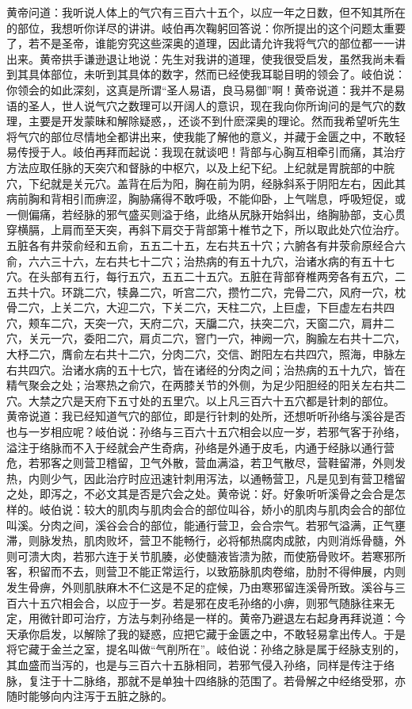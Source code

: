 \documentclass[12pt,UTF8]{ctexbook}
\begin{document}
黄帝问道：我听说人体上的气穴有三百六十五个，以应一年之日数，但不知其所在的部位，我想听你详尽的讲讲。岐伯再次鞠躬回答说：你所提出的这个问题太重要了，若不是圣帝，谁能穷究这些深奥的道理，因此请允许我将气穴的部位都一一讲出来。黄帝拱手谦逊退让地说：先生对我讲的道理，使我很受启发，虽然我尚未看到其具体部位，未听到其具体的数字，然而已经使我耳聪目明的领会了。岐伯说：你领会的如此深刻，这真是所谓“圣人易语，良马易御”啊！黄帝说道：我并不是易语的圣人，世人说气穴之数理可以开阔人的意识，现在我向你所询问的是气穴的数理，主要是开发蒙昧和解除疑惑，，还谈不到什麽深奥的理论。然而我希望听先生将气穴的部位尽情地全都讲出来，使我能了解他的意义，并藏于金匮之中，不敢轻易传授于人。岐伯再拜而起说：我现在就谈吧！背部与心胸互相牵引而痛，其治疗方法应取任脉的天突穴和督脉的中枢穴，以及上纪下纪。上纪就是胃脘部的中脘穴，下纪就是关元穴。盖背在后为阳，胸在前为阴，经脉斜系于阴阳左右，因此其病前胸和背相引而痹涩，胸胁痛得不敢呼吸，不能仰卧，上气喘息，呼吸短促，或一侧偏痛，若经脉的邪气盛买则溢于络，此络从尻脉开始斜出，络胸胁部，支心贯穿横膈，上肩而至天突，再斜下肩交于背部第十椎节之下，所以取此处穴位治疗。
五脏各有井荥俞经和五俞，五五二十五，左右共五十穴；六腑各有井荥俞原经合六俞，六六三十六，左右共七十二穴；治热病的有五十九穴，治诸水病的有五十七穴。在头部有五行，每行五穴，五五二十五穴。五脏在背部脊椎两旁各有五穴，二五共十穴。环跳二穴，犊鼻二穴，听宫二穴，攒竹二穴，完骨二穴，风府一穴，枕骨二穴，上关二穴，大迎二穴，下关二穴，天柱二穴，上巨虚，下巨虚左右共四穴，颊车二穴，天突一穴，天府二穴，天牖二穴，扶突二穴，天窗二穴，肩井二穴，关元一穴，委阳二穴，肩贞二穴，窨门一穴，神阙一穴，胸腧左右共十二穴，大杼二穴，膺俞左右共十二穴，分肉二穴，交信、跗阳左右共四穴，照海，申脉左右共四穴。治诸水病的五十七穴，皆在诸经的分肉之间；治热病的五十九穴，皆在精气聚会之处；治寒热之俞穴，在两膝关节的外侧，为足少阳胆经的阳关左右共二穴。大禁之穴是天府下五寸处的五里穴。以上凡三百六十五穴都是针刺的部位。
黄帝说道：我已经知道气穴的部位，即是行针刺的处所，还想听听孙络与溪谷是否也与一岁相应呢？岐伯说：孙络与三百六十五穴相会以应一岁，若邪气客于孙络，溢注于络脉而不入于经就会产生奇病，孙络是外通于皮毛，内通于经脉以通行营危，若邪客之则营卫稽留，卫气外散，营血满溢，若卫气散尽，营鞋留滞，外则发热，内则少气，因此治疗时应迅速针刺用泻法，以通畅营卫，凡是见到有营卫稽留之处，即泻之，不必文其是否是穴会之处。黄帝说：好。好象听听溪骨之会合是怎样的。岐伯说：较大的肌肉与肌肉会合的部位叫谷，娇小的肌肉与肌肉会合的部位叫溪。分肉之间，溪谷会合的部位，能通行营卫，会合宗气。若邪气溢满，正气壅滞，则脉发热，肌肉败坏，营卫不能畅行，必将郁热腐肉成脓，内则消烁骨髓，外则可溃大肉，若邪六连于关节肌腠，必使髓液皆溃为脓，而使筋骨败坏。若寒邪所客，积留而不去，则营卫不能正常运行，以致筋脉肌肉卷缩，肋肘不得伸展，内则发生骨痹，外则肌肤麻木不仁这是不足的症候，乃由寒邪留连溪骨所致。溪谷与三百六十五穴相会合，以应于一岁。若是邪在皮毛孙络的小痹，则邪气随脉往来无定，用微针即可治疗，方法与刺孙络是一样的。黄帝乃避退左右起身再拜说道：今天承你启发，以解除了我的疑惑，应把它藏于金匮之中，不敢轻易拿出传人。于是将它藏于金兰之室，提名叫做“气削所在”。岐伯说：孙络之脉是属于经脉支别的，其血盛而当泻的，也是与三百六十五脉相同，若邪气侵入孙络，同样是传注于络脉，复注于十二脉络，那就不是单独十四络脉的范围了。若骨解之中经络受邪，亦随时能够向内注泻于五脏之脉的。
\end{document}
